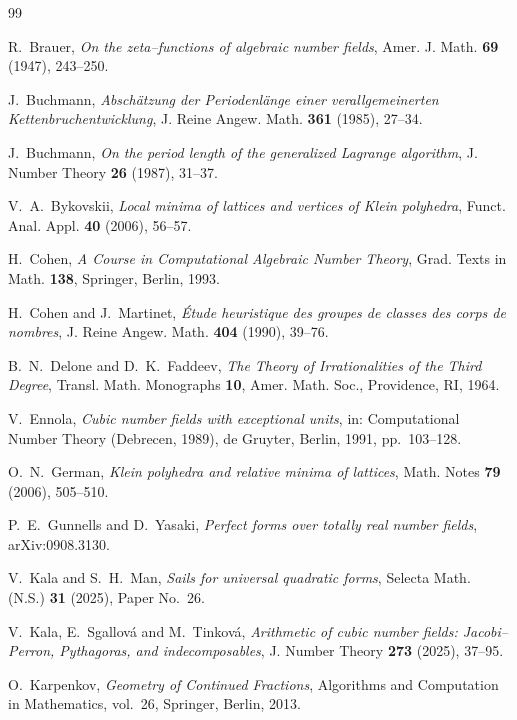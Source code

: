 \documentclass[11pt,reqno]{amsart}
\theoremstyle{plain}
\theoremstyle{definition}
\begin{document}
\begin{thebibliography}{99}

R.~Brauer, \emph{On the zeta--functions of algebraic number fields}, Amer. J. Math. \textbf{69} (1947),
243--250.

J.~Buchmann, \emph{Absch\"atzung der Periodenl\"ange einer verallgemeinerten Kettenbruchentwicklung},
J. Reine Angew. Math. \textbf{361} (1985), 27--34.

J.~Buchmann, \emph{On the period length of the generalized Lagrange algorithm}, J. Number Theory \textbf{26}
(1987), 31--37.

V.~A.~Bykovskii, \emph{Local minima of lattices and vertices of Klein polyhedra}, Funct. Anal. Appl.
\textbf{40} (2006), 56--57.

H.~Cohen, \emph{A Course in Computational Algebraic Number Theory}, Grad. Texts in Math. \textbf{138},
Springer, Berlin, 1993.

H.~Cohen and J.~Martinet, \emph{\'Etude heuristique des groupes de classes des corps de nombres},
J. Reine Angew. Math. \textbf{404} (1990), 39--76.

B.~N.~Delone and D.~K.~Faddeev, \emph{The Theory of Irrationalities of the Third Degree}, Transl. Math.
Monographs \textbf{10}, Amer. Math. Soc., Providence, RI, 1964.

V.~Ennola, \emph{Cubic number fields with exceptional units}, in: Computational Number Theory (Debrecen,
1989), de Gruyter, Berlin, 1991, pp.~103--128.

O.~N.~German, \emph{Klein polyhedra and relative minima of lattices}, Math. Notes \textbf{79} (2006),
505--510.

P.~E.~Gunnells and D.~Yasaki, \emph{Perfect forms over totally real number fields}, arXiv:0908.3130.

V.~Kala and S.~H.~Man, \emph{Sails for universal quadratic forms}, Selecta Math. (N.S.) \textbf{31} (2025),
Paper No.~26.

V.~Kala, E.~Sgallov\'a and M.~Tinkov\'a, \emph{Arithmetic of cubic number fields: Jacobi--Perron,
Pythagoras, and indecomposables}, J. Number Theory \textbf{273} (2025), 37--95.

O.~Karpenkov, \emph{Geometry of Continued Fractions}, Algorithms and Computation in Mathematics, vol.~26,
Springer, Berlin, 2013.


\end{thebibliography}
\end{document}
